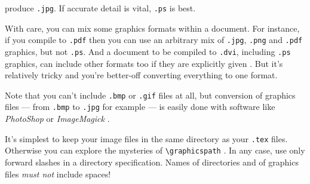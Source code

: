 produce \texttt{.jpg}. If accurate detail is vital, \texttt{.ps} is
best.
\par
With care, you can mix some graphics formats within a document. For
instance, if you compile to \texttt{.pdf} then you can use an
arbitrary mix of \texttt{.jpg}, \texttt{.png} and \texttt{.pdf}
graphics, but not \texttt{.ps}. And a document to be compiled to
\texttt{.dvi}, including \texttt{.ps} graphics, can include other
formats too if they are explicitly given . But
it's relatively tricky and you're better-off converting everything to
one format.
\par
Note that you can't include \texttt{.bmp} or \texttt{.gif} files at
all, but conversion of graphics files --- from \texttt{.bmp} to
\texttt{.jpg} for example --- is easily done with software like
\textsl{PhotoShop} \cite{PS} or \textsl{ImageMagick} \cite{IM}.
\par
It's simplest to keep your image files in the same directory as your
\texttt{.tex} files. Otherwise you can explore the mysteries of
\verb+\graphicspath+ \cite[Sec.~10.2.5]{MG}. In any case, use only
forward slashes in a directory specification. Names of directories and
of graphics files \textit{must not} include spaces!
%
